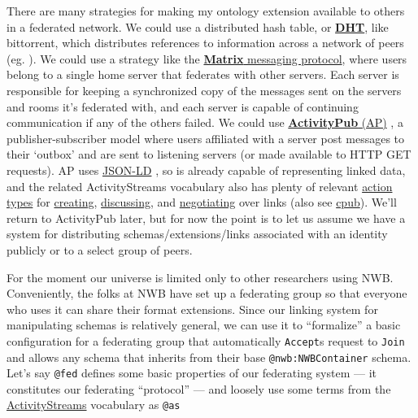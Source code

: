 \documentclass[10pt]{article}
\begin{document}
\begin{multicols}{2}
There are many strategies for making my ontology extension available to
others in a federated network. We could use a distributed hash table, or
\href{https://en.wikipedia.org/wiki/Distributed_hash_table}{\textbf{DHT}},
like bittorrent, which distributes references to information across a
network of peers (eg. \cite{pirroDHTbasedSemanticOverlay2012} ).
We could use a strategy like the
\href{https://matrix.org/}{\textbf{Matrix} messaging protocol}, where
users belong to a single home server that federates with other servers.
Each server is responsible for keeping a synchronized copy of the
messages sent on the servers and rooms it's federated with, and each
server is capable of continuing communication if any of the others
failed. We could use
\href{https://www.w3.org/TR/2018/REC-activitypub-20180123/}{\textbf{ActivityPub}
(AP)} \cite{Webber:18:A} , a publisher-subscriber model where
users affiliated with a server post messages to their `outbox' and are
sent to listening servers (or made available to HTTP GET requests). AP
uses \href{https://json-ld.org/}{JSON-LD} \cite{spornyJSONLDJSONbasedSerialization2020} , so is already capable of
representing linked data, and the related ActivityStreams vocabulary
\cite{snellActivityStreams2017}  also has plenty of relevant
\href{https://www.w3.org/TR/activitystreams-vocabulary/\#activity-types}{action
types} for
\href{https://www.w3.org/TR/activitystreams-vocabulary/\#dfn-create}{creating},
\href{https://www.w3.org/TR/activitystreams-vocabulary/\#dfn-question}{discussing},
and
\href{https://www.w3.org/TR/activitystreams-vocabulary/\#dfn-tentativeaccept}{negotiating}
over links (also see
\href{https://github.com/openEngiadina/cpub}{cpub}). We'll return to
ActivityPub later, but for now the point is to let us assume we have a
system for distributing schemas/extensions/links associated with an
identity publicly or to a select group of peers.

For the moment our universe is limited only to other researchers using
NWB. Conveniently, the folks at NWB have set up a federating group so
that everyone who uses it can share their format extensions. Since our
linking system for manipulating schemas is relatively general, we can
use it to ``formalize'' a basic configuration for a federating group
that automatically \texttt{Accept}s request to \texttt{Join} and allows
any schema that inherits from their base \texttt{@nwb:NWBContainer}
schema. Let's say \texttt{@fed} defines some basic properties of our
federating system --- it constitutes our federating ``protocol'' --- and
loosely use some terms from the
\href{https://www.w3.org/ns/activitystreams\#class-definitions}{ActivityStreams}
vocabulary as \texttt{@as}


\end{multicols}
\end{document}
